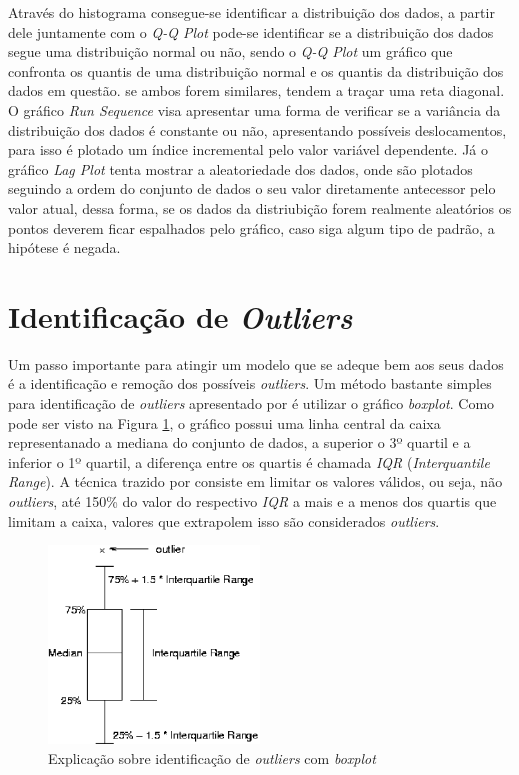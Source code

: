 Através do histograma consegue-se identificar a distribuição dos dados, a partir
dele juntamente com o \textit{Q-Q Plot} pode-se identificar se a distribuição
dos dados segue uma distribuição normal ou não, sendo o \textit{Q-Q Plot} um
gráfico que confronta os quantis de uma distribuição normal e os quantis da
distribuição dos dados em questão. se ambos forem similares, tendem a traçar uma
reta diagonal. O gráfico \textit{Run Sequence} visa apresentar uma forma de
verificar se a variância da distribuição dos dados é constante ou não,
apresentando possíveis deslocamentos, para isso é plotado um índice incremental
pelo valor variável dependente. Já o gráfico \textit{Lag Plot} tenta mostrar a
aleatoriedade dos dados, onde são plotados seguindo a ordem do conjunto de dados
o seu valor diretamente antecessor pelo valor atual, dessa forma, se os dados da
distriubição forem realmente aleatórios os pontos deverem ficar espalhados pelo
gráfico, caso siga algum tipo de padrão, a hipótese é negada.


\section{Identificação de \textit{Outliers}}\label{outliers}

Um passo importante para atingir um modelo que se adeque bem aos seus dados é a
identificação e remoção dos possíveis \textit{outliers}. Um método bastante
simples para identificação de \textit{outliers} apresentado por
 é utilizar o gráfico \textit{boxplot}. Como pode ser
visto na Figura \ref{fig:boxplot}, o gráfico possui uma linha central da caixa
representanado a mediana do conjunto de dados, a superior o 3º quartil e a inferior
o 1º quartil, a diferença entre os quartis é chamada \textit{IQR}
(\textit{Interquantile Range}). A técnica trazido por 
consiste em limitar os valores válidos, ou seja, não \textit{outliers}, até
150\% do valor do respectivo \textit{IQR} a mais e a menos dos quartis que
limitam a caixa, valores que extrapolem isso são considerados \textit{outliers}.

\begin{figure}[h]
  \centering
  \includegraphics[width=0.5\textwidth]
      {figuras/boxplot}
      \caption{Explicação sobre identificação de \textit{outliers} com
      \textit{boxplot}}
  \label{fig:boxplot}
\end{figure}

